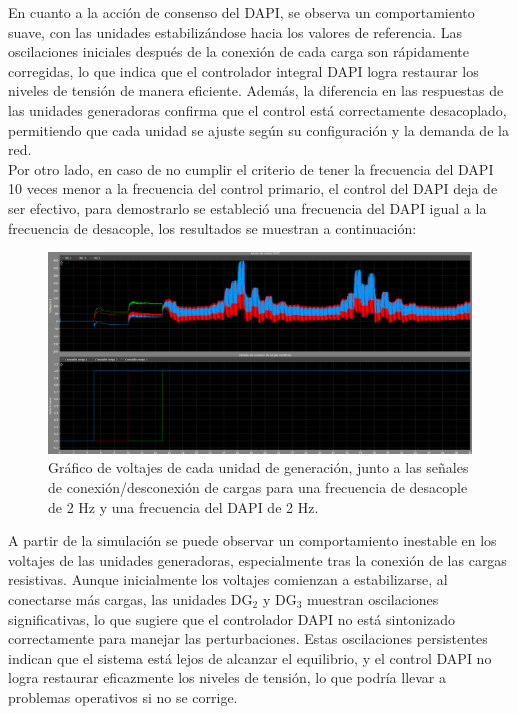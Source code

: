 En cuanto a la acción de consenso del DAPI, se observa un comportamiento suave, con las unidades estabilizándose hacia los valores de referencia. Las oscilaciones iniciales después de la conexión de cada carga son rápidamente corregidas, lo que indica que el controlador integral DAPI logra restaurar los niveles de tensión de manera eficiente. Además, la diferencia en las respuestas de las unidades generadoras confirma que el control está correctamente desacoplado, permitiendo que cada unidad se ajuste según su configuración y la demanda de la red.\\

Por otro lado, en caso de no cumplir el criterio de tener la frecuencia del DAPI 10 veces menor a la frecuencia del control primario, el control del DAPI deja de ser efectivo, para demostrarlo se estableció una frecuencia del DAPI igual a la frecuencia de desacople, los resultados se muestran a continuación:

\begin{figure}
    \centering
    \includegraphics[width=1.0\linewidth]{Tarea 2/report/imagenes/p2a/accion_dapi_mal.png}
    \caption{Gráfico de voltajes de cada unidad de generación, junto a las señales de conexión/desconexión de cargas para una frecuencia de desacople de 2 Hz y una frecuencia del DAPI de 2 Hz.}
    \label{accion_dapi_mal}
\end{figure}

A partir de la simulación se puede observar un comportamiento inestable en los voltajes de las unidades generadoras, especialmente tras la conexión de las cargas resistivas. Aunque inicialmente los voltajes comienzan a estabilizarse, al conectarse más cargas, las unidades DG$_2$ y DG$_3$ muestran oscilaciones significativas, lo que sugiere que el controlador DAPI no está sintonizado correctamente para manejar las perturbaciones. Estas oscilaciones persistentes indican que el sistema está lejos de alcanzar el equilibrio, y el control DAPI no logra restaurar eficazmente los niveles de tensión, lo que podría llevar a problemas operativos si no se corrige.

